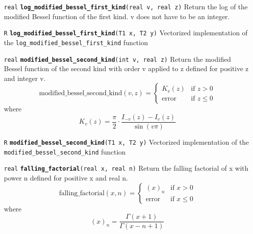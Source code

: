\documentclass[
  10pt,
]{book}
\begin{document}

\texttt{real} \textbf{\texttt{log\_modified\_bessel\_first\_kind}}\texttt{(real\ v,\ real\ z)}\newline
Return the log of the modified Bessel function of the first kind. v does
not have to be an integer.


\texttt{R} \textbf{\texttt{log\_modified\_bessel\_first\_kind}}\texttt{(T1\ x,\ T2\ y)}\newline
Vectorized implementation of the \texttt{log\_modified\_bessel\_first\_kind} function


\texttt{real} \textbf{\texttt{modified\_bessel\_second\_kind}}\texttt{(int\ v,\ real\ z)}\newline
Return the modified Bessel function of the second kind with order v
applied to z defined for positive z and integer v. \[
\mathrm{modified\_bessel\_second\_kind}(v,z) = \begin{cases} K_v(z) &
\text{if } z > 0 \\ \textrm{error} & \text{if } z \leq 0 \end{cases}
\] where \[ {K_v}(z) = \frac{\pi}{2}\cdot\frac{I_{-v}(z) -
I_{v}(z)}{\sin(v\pi)} \]


\texttt{R} \textbf{\texttt{modified\_bessel\_second\_kind}}\texttt{(T1\ x,\ T2\ y)}\newline
Vectorized implementation of the \texttt{modified\_bessel\_second\_kind} function


\texttt{real} \textbf{\texttt{falling\_factorial}}\texttt{(real\ x,\ real\ n)}\newline
Return the falling factorial of x with power n defined for positive x
and real n.~\[ \mathrm{falling\_factorial}(x,n) = \begin{cases} (x)_n
& \text{if } x > 0 \\ \textrm{error} & \text{if } x \leq 0 \end{cases}
\] where \[ (x)_n=\frac{\Gamma(x+1)}{\Gamma(x-n+1)} \]
\end{document}
